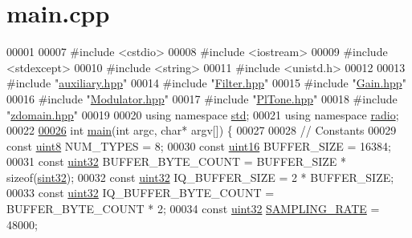 \hypertarget{main_8cpp_source}{\section{main.\+cpp}
\label{main_8cpp_source}
}

\begin{DoxyCode}
00001 
00007 \textcolor{preprocessor}{#include <cstdio>}
00008 \textcolor{preprocessor}{#include <iostream>}
00009 \textcolor{preprocessor}{#include <stdexcept>}
00010 \textcolor{preprocessor}{#include <string>}
00011 \textcolor{preprocessor}{#include <unistd.h>}
00012 
00013 \textcolor{preprocessor}{#include "\hyperlink{auxiliary_8hpp}{auxiliary.hpp}"}
00014 \textcolor{preprocessor}{#include "\hyperlink{Filter_8hpp}{Filter.hpp}"}
00015 \textcolor{preprocessor}{#include "\hyperlink{Gain_8hpp}{Gain.hpp}"}
00016 \textcolor{preprocessor}{#include "\hyperlink{Modulator_8hpp}{Modulator.hpp}"}
00017 \textcolor{preprocessor}{#include "\hyperlink{PlTone_8hpp}{PlTone.hpp}"}
00018 \textcolor{preprocessor}{#include "\hyperlink{zdomain_8hpp}{zdomain.hpp}"}
00019 
00020 \textcolor{keyword}{using namespace }\hyperlink{namespacestd}{std};
00021 \textcolor{keyword}{using namespace }\hyperlink{namespaceradio}{radio};
00022 
\hypertarget{main_8cpp_source_l00026}{}\hyperlink{main_8cpp_a0ddf1224851353fc92bfbff6f499fa97}{00026} \textcolor{keywordtype}{int} \hyperlink{main_8cpp_a0ddf1224851353fc92bfbff6f499fa97}{main}(\textcolor{keywordtype}{int} argc, \textcolor{keywordtype}{char}* argv[]) \{
00027 
00028     \textcolor{comment}{// Constants}
00029     \textcolor{keyword}{const} \hyperlink{definitions_8hpp_adde6aaee8457bee49c2a92621fe22b79}{uint8} NUM\_TYPES = 8;
00030     \textcolor{keyword}{const} \hyperlink{definitions_8hpp_a05f6b0ae8f6a6e135b0e290c25fe0e4e}{uint16} BUFFER\_SIZE = 16384;
00031     \textcolor{keyword}{const} \hyperlink{definitions_8hpp_a1134b580f8da4de94ca6b1de4d37975e}{uint32} BUFFER\_BYTE\_COUNT = BUFFER\_SIZE * \textcolor{keyword}{sizeof}(\hyperlink{definitions_8hpp_a0573de65958b4fda3a0460ed417dafb8}{sint32});
00032     \textcolor{keyword}{const} \hyperlink{definitions_8hpp_a1134b580f8da4de94ca6b1de4d37975e}{uint32} IQ\_BUFFER\_SIZE = 2 * BUFFER\_SIZE;
00033     \textcolor{keyword}{const} \hyperlink{definitions_8hpp_a1134b580f8da4de94ca6b1de4d37975e}{uint32} IQ\_BUFFER\_BYTE\_COUNT = BUFFER\_BYTE\_COUNT * 2;
00034     \textcolor{keyword}{const} \hyperlink{definitions_8hpp_a1134b580f8da4de94ca6b1de4d37975e}{uint32} \hyperlink{namespaceradio_a284213fea4beed2f74bb936927cbe654}{SAMPLING\_RATE} = 48000;

\end{DoxyCode}
